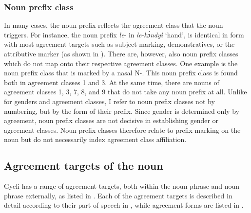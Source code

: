 \subsubsection*{Noun prefix class} In many cases, the noun prefix reflects the agreement class that the noun triggers. For instance, the noun prefix {\itshape le}- in {\itshape le-kɔ́ndyì} `hand', is identical in form with most agreement targets such as subject marking, demonstratives, or the attributive marker (as shown in ). There are, however, also noun prefix classes which do not map onto their respective agreement classes. One example is the noun prefix class that is marked by a nasal N-. This noun prefix class is found both in agreement classes 1 and 3. At the same time, there are nouns of agreement classes 1, 3, 7, 8, and 9 that do not take any noun prefix at all. Unlike for genders and agreement classes, I refer to noun prefix classes not by numbering, but by the form of their prefix.
Since gender is determined only by agreement, noun prefix classes are not decisive in establishing gender or agreement classes. Noun prefix classes therefore relate to prefix marking on the noun but do not necessarily index agreement class affiliation.  

\subsection{Agreement targets of the noun}
\label{sec:AGRtargets}

Gyeli has a range of agreement targets, both within the noun phrase and noun phrase externally, as listed in .  Each of the agreement targets is described in detail according to their part of speech in , while agreement forms are listed in .  


